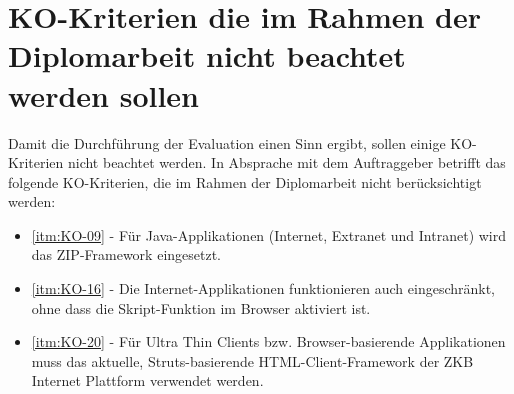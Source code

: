   \section{KO-Kriterien die im Rahmen der Diplomarbeit nicht beachtet werden
  sollen}\label{section:KoKriterienDieNichtBeachtetWerden}
  
  Damit die Durchführung der Evaluation einen Sinn ergibt, sollen einige
  KO-Kriterien nicht beachtet werden. In Absprache mit dem Auftraggeber
  betrifft das folgende KO-Kriterien, die im Rahmen der Diplomarbeit nicht
  berücksichtigt werden:
  
  \begin{itemize}
    \item \ref{itm:KO-09} - Für Java-Applikationen (Internet, Extranet und
    Intranet) wird das ZIP-Framework eingesetzt.
    \item \ref{itm:KO-16} - Die Internet-Applikationen funktionieren auch
    eingeschränkt, ohne dass die Skript-Funktion im Browser aktiviert ist.
    \item \ref{itm:KO-20} - Für Ultra Thin Clients bzw. Browser-basierende
    Applikationen muss das aktuelle, Struts-basierende HTML-Client-Framework
    der ZKB Internet Plattform verwendet werden.
  \end{itemize}
